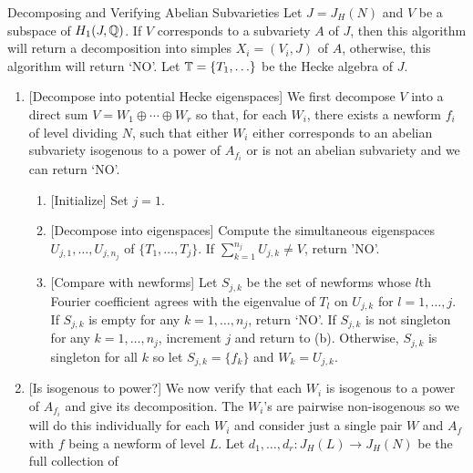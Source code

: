 \documentclass{article}
\begin{document}
\begin{algorithm}{Decomposing and Verifying Abelian Subvarieties}
    \label{alg:decomp_and_verify_subvarieties}
    Let $J=J_H(N)$ and $V$ be a subspace of $H_1(J, \mathbb{Q})$. If $V$ corresponds
    to a subvariety $A$ of $J$, then this algorithm will return a decomposition
    into simples $X_i=(V_i, J)$ of $A$, otherwise, this algorithm will return
    `NO'. Let $\mathbb{T}=\{T_1,\ldots\}$ be the Hecke algebra of $J$.
    \begin{enumerate}
        \item{} [Decompose into potential Hecke eigenspaces]
            We first decompose $V$ into a direct sum $V=W_1\oplus \cdots \oplus
            W_r$ so that, for each $W_i$, there exists a newform $f_i$ of level
            dividing $N$, such that either $W_i$ either corresponds to an
            abelian subvariety isogenous to a power of $A_{f_i}$ or is not an
            abelian subvariety and we can return `NO'.
            \begin{enumerate}
                \item{} [Initialize]
                    Set $j=1$.
                \item{} [Decompose into eigenspaces]
                    Compute the simultaneous eigenspaces $U_{j,1},\ldots,U_{j,
                    n_j}$ of $\{T_1,\ldots,T_j\}$. If $\sum_{k=1} ^{n_j}
                    U_{j, k}\neq V$, return 'NO'.
                \item{} [Compare with newforms]
                    Let $S_{j,k}$ be the set of newforms whose $l$th Fourier
                    coefficient agrees with the eigenvalue of $T_l$ on $U_{j,
                    k}$ for $l=1,\ldots,j$. If $S_{j, k}$ is empty for any
                    $k=1,\ldots,n_j$, return `NO'. If $S_{j,k}$ is not
                    singleton for any $k=1,\ldots, n_j$, increment $j$ and
                    return to (b). Otherwise, $S_{j,k}$ is singleton for all
                    $k$ so let $S_{j,k}=\{f_k\}$ and $W_k=U_{j,k}$.
            \end{enumerate}
        \item{} [Is isogenous to power?]
            We now verify that each $W_i$ is isogenous to a power of $A_{f_i}$
            and give its decomposition. The $W_i$'s are pairwise non-isogenous
            so we will do this individually for each $W_i$ and consider just a
            single pair $W$ and $A_f$ with $f$ being a newform of level $L$.
            Let $d_1,\ldots,d_r:J_H(L)\to J_H(N)$ be the full collection of

\end{enumerate}
\end{algorithm}
\end{document}
